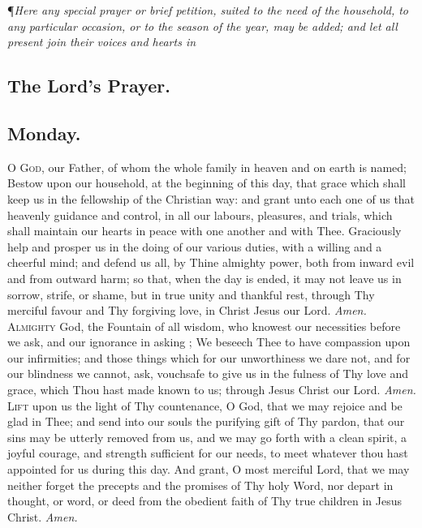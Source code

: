\noindent\P\textit{Here any special prayer or brief petition, suited to the need of the
household, to any particular occasion, or to the season of the
year, may be added; and let all present join their voices and
hearts in}

\subsection*{The Lord's Prayer.}

\subsection*{Monday.}

\lettrine{O}{ God,} our Father, of whom the whole family in heaven
and on earth is named; Bestow upon our household, at
the beginning of this day, that grace which shall keep us
in the fellowship of the Christian way: and grant unto
each one of us that heavenly guidance and control, in all
our labours, pleasures, and trials, which shall maintain our
hearts in peace with one another and with Thee. Graciously help and prosper us in the doing of our various
duties, with a willing and a cheerful mind; and defend us
all, by Thine almighty power, both from inward evil and
from outward harm; so that, when the day is ended, it may
not leave us in sorrow, strife, or shame, but in true unity
and thankful rest, through Thy merciful favour and Thy
forgiving love, in Christ Jesus our Lord.
\textit{Amen.} \\

\lettrine{A}{lmighty} God, the Fountain of all wisdom, who
knowest our necessities before we ask, and our ignorance in asking ; We beseech Thee to have compassion upon
our infirmities; and those things which for our unworthiness we dare not, and for our blindness we cannot, ask,
vouchsafe to give us in the fulness of Thy love and grace, 
which Thou hast made known to us; through Jesus Christ
our Lord.
\textit{Amen.} \\

\lettrine{L}{ift} upon us the light of Thy countenance, O God, that
we may rejoice and be glad in Thee; and send into our
souls the purifying gift of Thy pardon, that our sins may
be utterly removed from us, and we may go forth with a
clean spirit, a joyful courage, and strength sufficient for
our needs, to meet whatever thou hast appointed for us
during this day. And grant, O most merciful Lord, that
we may neither forget the precepts and the promises of Thy
holy Word, nor depart in thought, or word, or deed from
the obedient faith of Thy true children in Jesus Christ.
\textit{Amen.} \\ \\

